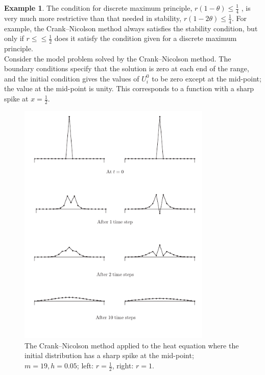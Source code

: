 \documentclass[a4paper,twoside]{ctexart}
\theoremstyle{definition}
\newtheorem{example}[definition]{Example}
\begin{document}
\begin{example}
	The condition for discrete maximum principle, $r(1 − \theta) \le \frac{1}{4}$ , is very much more
	restrictive than that needed in stability, $r(1 −
	2\theta) \le \frac{1}{4}$. For example, the Crank–Nicolson method always satisfies the
	stability condition, but only if $r ≤\le \frac{1}{2}$ does it satisfy the condition given for a discrete maximum principle.\\
	Consider the model problem
	solved by the Crank–Nicolson method. The boundary conditions specify
	that the solution is zero at each end of the range, and the initial condition gives the values of $U_i^0$ to be zero except at the mid-point; the value at
	the mid-point is unity. This corresponds to a function with a sharp spike
	at $x = \frac{1}{2}$.
	\newpage
	\begin{figure}[!htp]                                                                       
		\centering                                                                                                                  
		\includegraphics[width=9.2cm]{F3.png}                                           
		\caption*{The Crank–Nicolson method applied to the heat
			equation where the initial distribution has a sharp spike at the mid-point; $m = 19, h = 0.05$; left: $r = \frac{1}{2}$, right: $r = 1$.}                        
	\end{figure}
	

\end{example}
\end{document}
